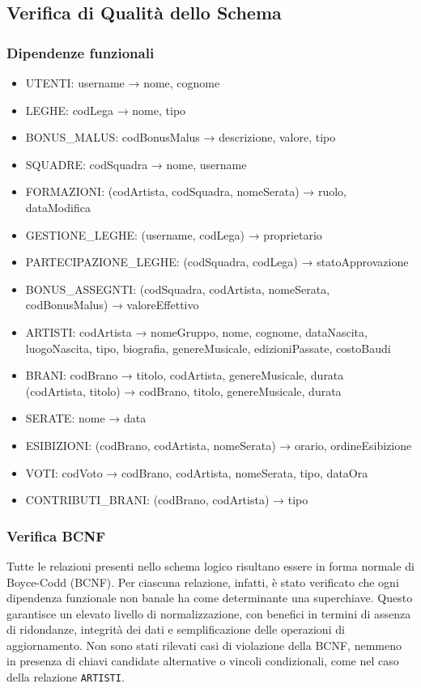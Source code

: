\documentclass[a4paper,12pt]{article}
\begin{document}
\subsection{Verifica di Qualità dello Schema}

\subsubsection{Dipendenze funzionali}

\begin{itemize}
	\item UTENTI: username → nome, cognome
	\item LEGHE: codLega → nome, tipo
	\item BONUS\_MALUS: codBonusMalus → descrizione, valore, tipo
	\item SQUADRE: codSquadra → nome, username
	\item FORMAZIONI: (codArtista, codSquadra, nomeSerata) → ruolo, dataModifica
	\item GESTIONE\_LEGHE: (username, codLega) → proprietario
	\item PARTECIPAZIONE\_LEGHE: (codSquadra, codLega) → statoApprovazione
	\item BONUS\_ASSEGNTI: (codSquadra, codArtista, nomeSerata, codBonusMalus) → valoreEffettivo
	\item ARTISTI: codArtista → nomeGruppo, nome, cognome, dataNascita,\\
	\hspace{4.5em} luogoNascita, tipo, biografia, genereMusicale, edizioniPassate, costoBaudi
	\item BRANI: codBrano → titolo, codArtista, genereMusicale, durata\\
	\hspace{4.5em}(codArtista, titolo) → codBrano, titolo, genereMusicale, durata
	\item SERATE: nome → data
	\item ESIBIZIONI: (codBrano, codArtista, nomeSerata) → orario, ordineEsibizione
	\item VOTI: codVoto → codBrano, codArtista, nomeSerata, tipo, dataOra
	\item CONTRIBUTI\_BRANI: (codBrano, codArtista) → tipo
\end{itemize}

\subsubsection{Verifica BCNF}
Tutte le relazioni presenti nello schema logico risultano essere in forma normale di Boyce-Codd (BCNF).  
Per ciascuna relazione, infatti, è stato verificato che ogni dipendenza funzionale non banale ha come determinante una superchiave.  
Questo garantisce un elevato livello di normalizzazione, con benefici in termini di assenza di ridondanze, integrità dei dati e semplificazione delle operazioni di aggiornamento.  
Non sono stati rilevati casi di violazione della BCNF, nemmeno in presenza di chiavi candidate alternative o vincoli condizionali, come nel caso della relazione \texttt{ARTISTI}.
\end{document}
